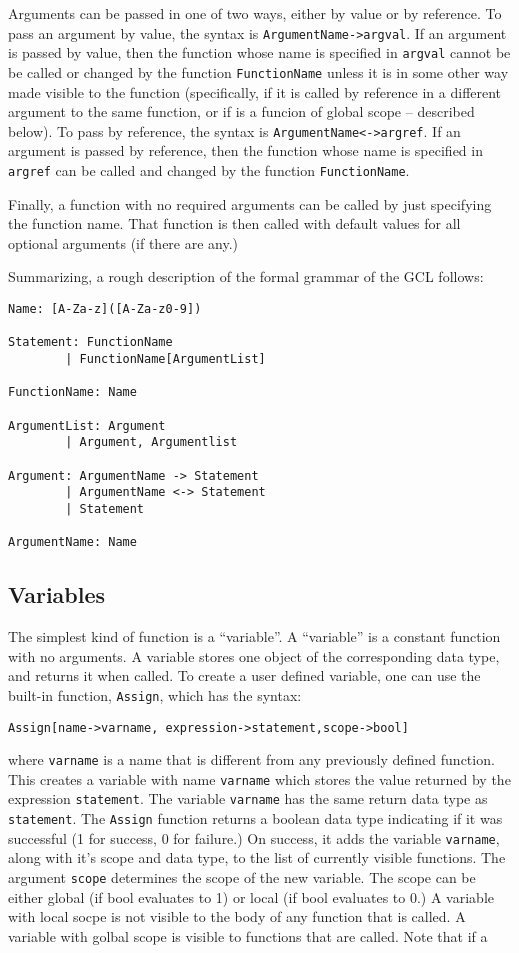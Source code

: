 Arguments can be passed in one of two ways, either by value or by
reference.  To pass an argument by value, the syntax is
\verb+ArgumentName->argval+.  If an argument is passed by value, then the
function whose name is specified in \verb+argval+ cannot be be called
or changed by the function \verb+FunctionName+ unless it is in some
other way made visible to the function (specifically, if it is called
by reference in a different argument to the same function, or if is a
funcion of global scope -- described below).  To pass by reference,
the syntax is \verb+ArgumentName<->argref+.  If an argument is passed
by reference, then the function whose name is specified in
\verb+argref+ can be called and changed by the function
\verb+FunctionName+.  

Finally, a function with no required arguments can be called by just
specifying the function name.  That function is then called with
default values for all optional arguments (if there are any.)

Summarizing, a rough description of the formal grammar of the GCL
follows:

\begin{verbatim}
Name: [A-Za-z]([A-Za-z0-9])

Statement: FunctionName
        | FunctionName[ArgumentList]

FunctionName: Name

ArgumentList: Argument
        | Argument, Argumentlist

Argument: ArgumentName -> Statement
        | ArgumentName <-> Statement
        | Statement

ArgumentName: Name
\end{verbatim}

\subsection{Variables}

The simplest kind of function is a ``variable''.  A ``variable'' is a
constant function with no arguments.  A variable stores one object of
the corresponding data type, and returns it when called.  To create a
user defined variable, one can use the built-in function,
\verb+Assign+, which has the syntax:
\begin{verbatim}
Assign[name->varname, expression->statement,scope->bool]
\end{verbatim}
where \verb+varname+ is a name that is different from any previously
defined function.  This creates a variable with name \verb+varname+
which stores the value returned by the expression \verb+statement+.
The variable \verb+varname+ has the same return data type as
\verb+statement+.  The \verb+Assign+ function returns a boolean data
type indicating if it was successful (1 for success, 0 for failure.)
On success, it adds the variable \verb+varname+, along with it's
scope and data type, to the list of currently visible functions.  The
argument \verb+scope+ determines the scope of the new variable.  The
scope can be either global (if bool evaluates to 1) or local (if bool
evaluates to 0.) A variable with local socpe is not visible to the
body of any function that is called.  A variable with golbal scope is
visible to functions that are called.  Note that if a 

